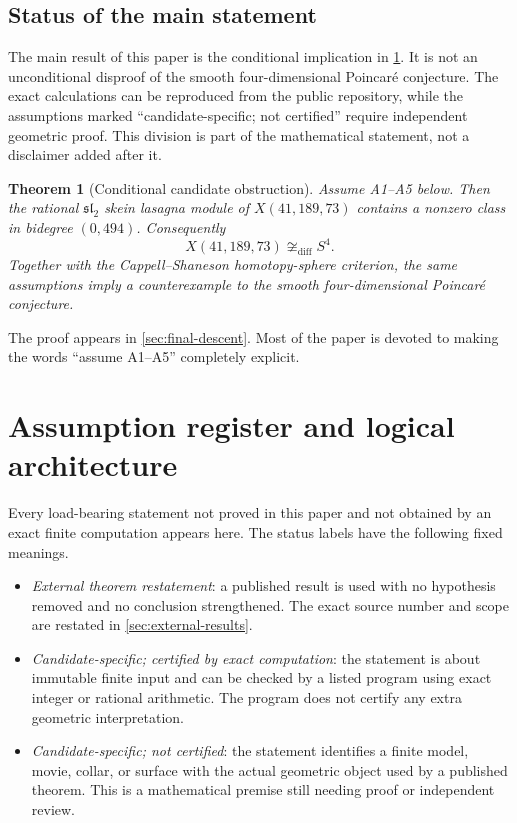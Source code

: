\documentclass[10pt,reqno]{amsart}
\newtheorem{theorem}{Theorem}[section]
\theoremstyle{definition}
\theoremstyle{remark}
\begin{document}
\subsection{Status of the main statement}

The main result of this paper is the conditional implication in
\cref{thm:main-conditional}.  It is not an unconditional disproof of the
smooth four-dimensional Poincar\'e conjecture.  The exact calculations can be
reproduced from the public repository, while the assumptions marked
``candidate-specific; not certified'' require independent geometric proof.
This division is part of the mathematical statement, not a disclaimer added
after it.

\begin{theorem}[Conditional candidate obstruction]\label{thm:main-conditional}
Assume \textup{A1--A5} below.  Then the rational
$\mathfrak{sl}_2$ skein lasagna module of $X(41,189,73)$ contains a nonzero
class in bidegree $(0,494)$.  Consequently
\[
  X(41,189,73)\not\cong_{\mathrm{diff}}S^4.
\]
Together with the Cappell--Shaneson homotopy-sphere criterion, the same
assumptions imply a counterexample to the smooth four-dimensional Poincar\'e
conjecture.
\end{theorem}

The proof appears in \cref{sec:final-descent}.  Most of the paper is devoted
to making the words ``assume A1--A5'' completely explicit.

\section{Assumption register and logical architecture}\label{sec:assumptions}

Every load-bearing statement not proved in this paper and not obtained by an
exact finite computation appears here.  The status labels have the following
fixed meanings.

\begin{itemize}
\item \emph{External theorem restatement}: a published result is used with
  no hypothesis removed and no conclusion strengthened.  The exact source
  number and scope are restated in \cref{sec:external-results}.
\item \emph{Candidate-specific; certified by exact computation}: the statement
  is about immutable finite input and can be checked by a listed program using
  exact integer or rational arithmetic.  The program does not certify any
  extra geometric interpretation.
\item \emph{Candidate-specific; not certified}: the statement identifies a
  finite model, movie, collar, or surface with the actual geometric object
  used by a published theorem.  This is a mathematical premise still needing
  proof or independent review.
\end{itemize}
\end{document}
